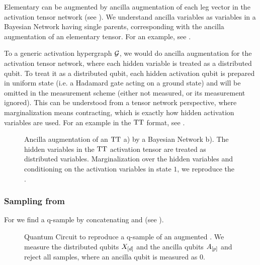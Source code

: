 Elementary \ComputationActivationNetworks{} can be augmented by ancilla augmentation of each leg vector in the activation tensor network (see ).
We understand ancilla variables as variables in a Bayesian Network having single parents, corresponding with the ancilla augmentation of an elementary tensor.
For an example, see .

To a generic activation hypergraph $\mathcal{G}$, we would do ancilla augmentation for the activation tensor network, where each hidden variable is treated as a distributed qubit.
To treat it as a distributed qubit, each hidden activation qubit is prepared in uniform state (i.e. a Hadamard gate acting on a ground state) and will be omitted in the measurement scheme (either not measured, or its measurement ignored).
This can be understood from a tensor network perspective, where marginalization means contracting, which is exactly how hidden activation variables are used.
For an example in the $\mathrm{TT}$ format, see .

\begin{figure}[t]
    \begin{center}
        
    \end{center}
    \caption{Ancilla augmentation of an $\mathrm{TT}$ \ComputationActivationNetwork{} a) by a Bayesian Network b).
    The hidden variables in the $\mathrm{TT}$ activation tensor are treated as distributed variables.
    Marginalization over the hidden variables and conditioning on the activation variables in state $1$, we reproduce the \ComputationActivationNetwork{}.}
    \label{fig:canTTAugmentation}
\end{figure}

\subsubsection{Sampling from \ComputationActivationNetworks{}}

For \ComputationActivationNetworks{} we find a q-sample by concatenating \computationCircuits{} and \activationCircuits{} (see ).

\begin{figure}
    \begin{center}
        
    \end{center}
    \caption{
        Quantum Circuit to reproduce a q-sample of an augmented \ComputationActivationNetwork{}.
        We measure the distributed qubits $X_{[d]}$ and the ancilla qubits $A_{[p]}$ and reject all samples, where an ancilla qubit is measured as $0$.
    }\label{fig:caCircuit}
\end{figure}

